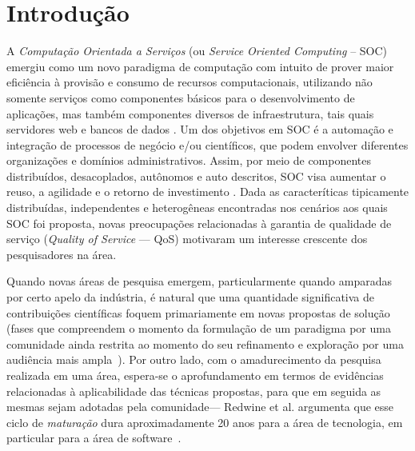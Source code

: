 
\section{Introdu\c{c}\~{a}o}\label{sec:introduction}

A \emph{Computa\c c\~{a}o Orientada a Servi\c cos} (ou \emph{Service Oriented Computing} -- SOC) emergiu como um novo paradigma de computa\c c\~{a}o com intuito de prover maior eficiência à provisão e consumo de recursos computacionais, utilizando não somente servi\c cos como componentes b\'{a}sicos para o desenvolvimento de aplica\c c\~{o}es, mas também componentes diversos de infraestrutura, tais quais servidores web e bancos de dados \cite{papazoglou:cacm2003} \cite{10.1109/MIC.2010.147}. Um dos objetivos em SOC \'{e} a automa\c c\~{a}o e integra\c c\~{a}o de processos de neg\'{o}cio e/ou cient\'{i}ficos, que podem envolver diferentes organiza\c c\~{o}es e domínios administrativos. Assim, por meio de componentes distribuídos, desacoplados, autônomos e auto descritos, SOC visa aumentar o reuso, a agilidade e o retorno de investimento \cite{Erl:2007:SPS:1296147}. Dada as caracter\'{i}ticas tipicamente distribu\'{i}das, independentes e heterog\^{e}neas encontradas nos cen\'{a}rios aos quais SOC foi proposta, novas preocupa\c c\~{o}es relacionadas \`{a} garantia de qualidade de servi\c co (\emph{Quality of Service} --- QoS) motivaram um interesse crescente dos pesquisadores na \'{a}rea. 






Quando novas \'{a}reas de pesquisa emergem, particularmente quando amparadas por certo apelo da ind\'{u}stria, \'{e} natural que uma quantidade significativa de contribui\c c\~{o}es cient\'{i}ficas foquem primariamente em novas propostas de solu\c c\~{a}o (fases que compreendem o momento da formula\c c\~{a}o de um paradigma por uma comunidade ainda restrita ao momento do seu refinamento e explora\c c\~{a}o por uma audi\^{e}ncia mais ampla~\cite{redwine:icse1985}). Por outro lado, com o amadurecimento da pesquisa realizada em uma \'{a}rea, espera-se o aprofundamento em termos de evid\^{e}ncias relacionadas \`{a} aplicabilidade das t\'{e}cnicas propostas, para que em seguida as mesmas sejam adotadas pela comunidade--- Redwine et al. argumenta que esse ciclo de \emph{matura\c c\~{a}o} dura aproximadamente 20 anos para a \'{a}rea de tecnologia, em particular para a \'{a}rea de software~\cite{redwine:icse1985}.

